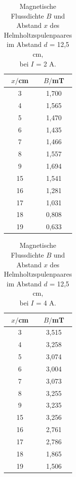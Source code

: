 \begin{minipage}{0.6\textwidth}
\begin{table}[H]
  \centering
  \caption{Magnetische Flussdichte $B$ und \\ Abstand $x$ des Helmholtzspulenpaares \\ im Abstand $d$ = 12,5 cm, \\ bei $I$ = 2 A.}
  \begin{tabular}{c c}
    \toprule
     $x/$cm & $B/$mT  \\
    \midrule
    3 & 1,700 \\
    4 & 1,565 \\
    5 & 1,470 \\
    6 & 1,435 \\
    7 & 1,466 \\
    8 & 1,557\\
    9 & 1,694 \\
    15 & 1,541 \\
    16& 1,281\\
    17& 1,031 \\
    18& 0,808 \\
    19& 0,633 \\
  \bottomrule
  \end{tabular}
\end{table}
\end{minipage}
\begin{minipage}{0.6\textwidth}
\begin{table}[H]
  \centering
  \caption{Magnetische Flussdichte $B$  und \\ Abstand $x$ des Helmholtzspulenpaares \\ im Abstand $d$ = 12,5 cm, \\ bei $I$ = 4 A.}
  \begin{tabular}{c c}
    \toprule
     $x/$cm & $B/$mT  \\
    \midrule
    3 & 3,515 \\
    4 & 3,258 \\
    5 & 3,074 \\
    6 & 3,004 \\
    7 & 3,073 \\
    8 & 3,255\\
    9 & 3,235 \\
    15 & 3,256 \\
    16& 2,761 \\
    17& 2,786 \\
    18& 1,865 \\
    19& 1,506 \\
  \bottomrule
  \end{tabular}
\end{table}
\end{minipage}
